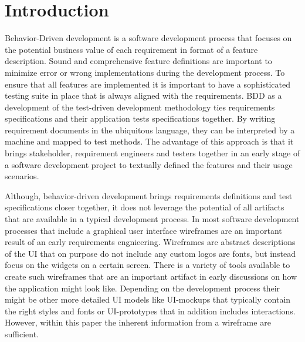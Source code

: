 \documentclass{sig-alternate-05-2015}
\begin{document}
\section{Introduction}
Behavior-Driven development is a software development process that focuses on the potential business value of each requirement in format of a feature description.
Sound and comprehensive feature definitions are important to minimize error or wrong implementations during the development process.
To ensure that all features are implemented it is important to have a sophisticated testing suite in place that is always aligned with the requirements. 
BDD as a development of the test-driven development methodology ties requirements specifications and their application tests specifications together. 
By writing requirement documents in the ubiquitous language, they can be interpreted by a machine and mapped to test methods. 
The advantage of this approach is that it brings stakeholder, requirement engineers and testers together in an early stage of a software development project to textually defined the features and their usage scenarios.

Although, behavior-driven development brings requirements definitions and test specifications closer together, it does not leverage the potential of all artifacts that are available in a typical development process.
In most software development processes that include a graphical user interface wireframes are an important result of an early requirements engnieering.
Wireframes are abstract descriptions of the UI that on purpose do not include any custom logos are fonts, but instead focus on the widgets on a certain screen.
There is a variety of tools available to create such wireframes that are an important artifact in early discussions on how the application might look like.
Depending on the development process their might be other more detailed UI models like UI-mockups that typically contain the right styles and fonts or UI-prototypes that in addition includes interactions.
However, within this paper the inherent information from a wireframe are sufficient.
\end{document}
